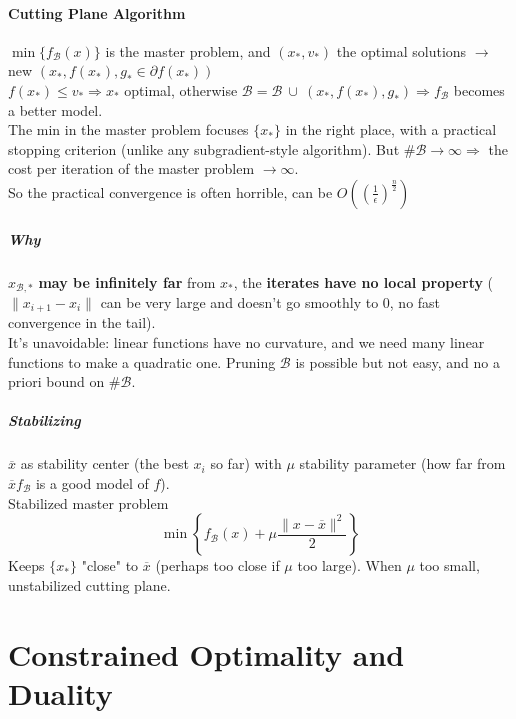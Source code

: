 \documentclass[10pt]{report}
\begin{document}
\paragraph{Cutting Plane Algorithm} $\min\{f_\mathscr{B}(x)\}$ is the master problem, and $(x_*, v_*)$ the optimal solutions $\rightarrow$ new $(x_*, f(x_*), g_*\in\partial f(x_*))$\\
$f(x_*)\leq v_*\Rightarrow x_*$ optimal, otherwise $\mathscr{B}= \mathscr{B}\:\cup\:(x_*, f(x_*), g_*)\Rightarrow f_\mathscr{B}$ becomes a better model.\\
The min in the master problem focuses $\{x_*\}$ in the right place, with a practical stopping criterion (unlike any subgradient-style algorithm). But $\#\mathscr{B}\rightarrow\infty\Rightarrow$ the cost per iteration of the master problem $\rightarrow\infty$.\\
So the practical convergence is often horrible, can be $O\left( \left(\frac{1}{\epsilon}\right)^{\frac{n}{2}}\right)$
\subparagraph{Why} $x_{\mathscr{B},*}$ \textbf{may be infinitely far} from $x_*$, the \textbf{iterates have no local property} ($\|x_{i+1}-x_i\|$ can be very large and doesn't go smoothly to $0$, no fast convergence in the tail).\\
It's unavoidable: linear functions have no curvature, and we need many linear functions to make a quadratic one. Pruning $\mathscr{B}$ is possible but not easy, and no a priori bound on $\# \mathscr{B}$.
\subparagraph{Stabilizing} $\overline{x}$ as stability center (the best $x_i$ so far) with $\mu$ stability parameter (how far from $\overline{x} f_\mathscr{B}$ is a good model of $f$).\\
Stabilized master problem $$\min\left\{f_\mathscr{B}(x)+\mu\frac{\|x-\overline{x}\|^2}{2}\right\}$$ Keeps $\{x_*\}$ "close" to $\overline{x}$ (perhaps too close if $\mu$ too large). When $\mu$ too small, unstabilized cutting plane.
\section{Constrained Optimality and Duality}
\end{document}
